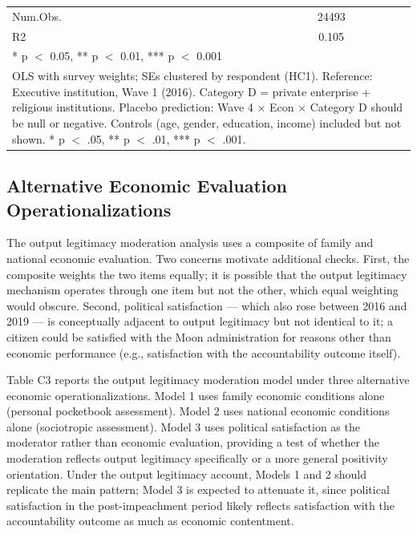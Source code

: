 \documentclass[
  12pt,
  letterpaper]{article}
\begin{document}
\begin{table}
{\begin{tabular}[t]{lc}
\midrule
Num.Obs. & \num{24493}\\
R2 & \num{0.105}\\
\bottomrule
\multicolumn{2}{l}{\rule{0pt}{1em}* p $<$ 0.05, ** p $<$ 0.01, *** p $<$ 0.001}\\
\multicolumn{2}{l}{\rule{0pt}{1em}OLS with survey weights; SEs clustered by respondent (HC1). Reference: Executive institution, Wave 1 (2016). Category D = private enterprise + religious institutions. Placebo prediction: Wave 4 × Econ × Category D should be null or negative. Controls (age, gender, education, income) included but not shown. * p $<$ .05, ** p $<$ .01, *** p $<$ .001.}\\
\end{tabular}

}

\end{table}%

\subsection{Alternative Economic Evaluation
Operationalizations}\label{sec-econ-alt}

The output legitimacy moderation analysis uses a composite of family and
national economic evaluation. Two concerns motivate additional checks.
First, the composite weights the two items equally; it is possible that
the output legitimacy mechanism operates through one item but not the
other, which equal weighting would obscure. Second, political
satisfaction --- which also rose between 2016 and 2019 --- is
conceptually adjacent to output legitimacy but not identical to it; a
citizen could be satisfied with the Moon administration for reasons
other than economic performance (e.g., satisfaction with the
accountability outcome itself).

Table C3 reports the output legitimacy moderation model under three
alternative economic operationalizations. Model 1 uses family economic
conditions alone (personal pocketbook assessment). Model 2 uses national
economic conditions alone (sociotropic assessment). Model 3 uses
political satisfaction as the moderator rather than economic evaluation,
providing a test of whether the moderation reflects output legitimacy
specifically or a more general positivity orientation. Under the output
legitimacy account, Models 1 and 2 should replicate the main pattern;
Model 3 is expected to attenuate it, since political satisfaction in the
post-impeachment period likely reflects satisfaction with the
accountability outcome as much as economic contentment.
\end{document}

